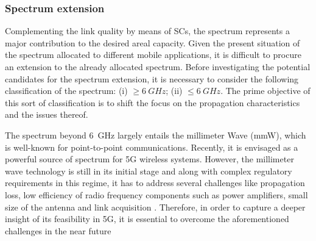 \subsubsection*{Spectrum extension}
Complementing the link quality by means of SCs, the spectrum represents a major contribution to the desired areal capacity. Given the present situation of the spectrum allocated to different mobile applications, it is difficult to procure an extension to the already allocated spectrum. Before investigating the potential candidates for the spectrum extension, it is necessary to consider the following classification of the spectrum:
(i) $\ge \SI{6}{GHz}$;
(ii) $\le \SI{6}{GHz}$.
The prime objective of this sort of classification is to shift the focus on the propagation characteristics and the issues thereof.


The spectrum beyond \SI{6}{GHz} largely entails the millimeter Wave (mmW), which is well-known for point-to-point communications. Recently, it is envisaged as a powerful source of spectrum for 5G wireless systems. However, the millimeter wave technology is still in its initial stage and along with complex regulatory requirements in this regime, it has to address several challenges like propagation loss, low efficiency of radio frequency components such as power amplifiers, small size of the antenna and link acquisition \cite{Rapp13}. Therefore, in order to capture a deeper insight of its feasibility in 5G, it is essential to overcome the aforementioned challenges in the near future

